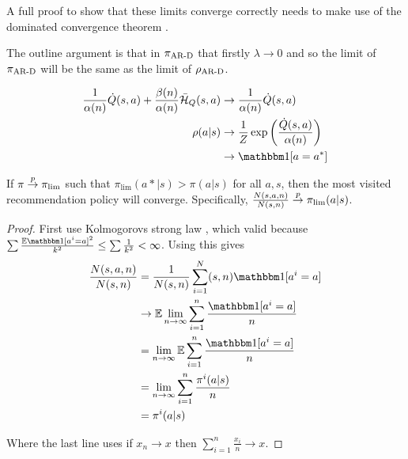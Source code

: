     \begin{proofoutline}
        A full proof to show that these limits converge correctly needs to make use of the dominated convergence theorem . 

        The outline argument is that in ${\pi_{{\textnormal{AR-D}}}}$ that firstly $\lambda \rightarrow 0$ and so the limit of ${\pi_{{\textnormal{AR-D}}}}$ will be the same as the limit of ${\rho_{{\textnormal{AR-D}}}}$. 
        
        \begin{align}
            \frac{1}{\alpha(n)}\dot{Q}(s,a) + \frac{\beta(n)}{\alpha(n)} \bar{\cl{H}}_Q(s,a) 
                &\rightarrow \frac{1}{\alpha(n)}\dot{Q}(s,a) \\
            \rho(a|s) &\rightarrow \frac{1}{Z} \exp\left(\frac{\dot{Q}(s,a)}{\alpha(n)}\right) \\
                &\rightarrow \one[a=a^*]
        \end{align}

    \end{proofoutline}










    \begin{lemma}
        If $\pi\overset{p}{\to}\pi_{\lim}$ such that $\pi_{\lim}(a*|s)>\pi(a|s)$ for all $a,s$, then the most visited recommendation policy will converge. Specifically, $\frac{N(s,a,n)}{N(s,n)} \overset{p}{\to} \pi_{\lim}(a|s)$.
    \end{lemma}
    \begin{proof}
        First use Kolmogorovs strong law , which valid because $\sum\frac{\bb{E}\one[a^i=a]^2}{k^2} \leq \sum \frac{1}{k^2} < \infty$. Using this gives
        \begin{align}
            \frac{N(s,a,n)}{N(s,n)}
                &= \frac{1}{N(s,n)} \sum_{i=1}^N(s,n) \one[a^i = a] \\
                &\rightarrow \bb{E} \lim_{n\rightarrow\infty} \sum_{i=1}^n \frac{\one[a^i=a]}{n} \\
                &= \lim_{n\rightarrow\infty} \bb{E} \sum_{i=1}^n \frac{\one[a^i=a]}{n} \\
                &= \lim_{n\rightarrow\infty} \sum_{i=1}^n \frac{\pi^i(a|s)}{n} \\
                &= \pi^i(a|s)
        \end{align}

        Where the last line uses if $x_n \rightarrow x$ then $\sum_{i=1}^n \frac{x_i}{n} \rightarrow x$. 
    \end{proof}

